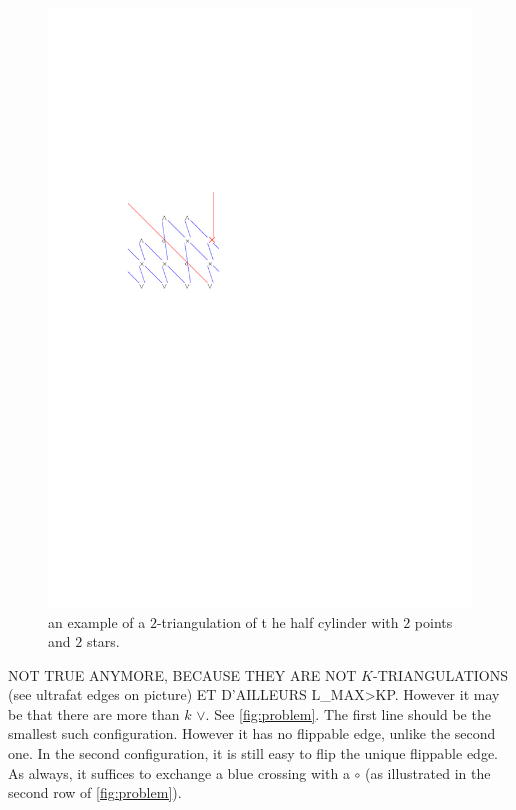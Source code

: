 \documentclass{amsart}
\theoremstyle{remark}
\begin{document}
\begin{figure}\label{fig:2stars}
\includegraphics[width=.98\linewidth,page=3]{latticeRepresentation}
\caption{an example of a $2$-triangulation of t	he half cylinder with $2$ points and $2$ stars.}
\end{figure}

\medskip

NOT TRUE ANYMORE, BECAUSE THEY ARE NOT $K$-TRIANGULATIONS (see ultrafat edges on picture) ET D'AILLEURS L_MAX>KP.
However it may be that there are more than $k$ $\vee$. See \cref{fig:problem}. The first line should be the smallest such configuration. However it has no flippable edge, unlike the second one. In the second configuration, it is still easy to flip the unique flippable edge. As always, it suffices to exchange a blue crossing with a $\circ$ (as illustrated in the second row of \cref{fig:problem}). 
\end{document}
